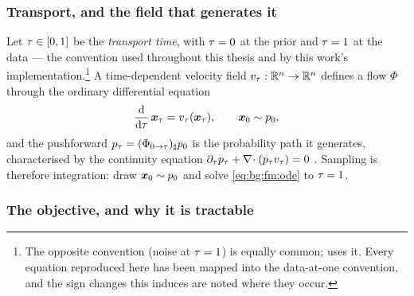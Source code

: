 \subsubsection*{Transport, and the field that generates it}

Let $\tau \in [0,1]$ be the \emph{transport time}, with $\tau = 0$ at the prior and
$\tau = 1$ at the data --- the convention used throughout this thesis and by this work's
implementation.\footnote{The opposite convention (noise at $\tau=1$) is equally common;
\parencite{geng2025meanflow} uses it. Every equation reproduced here has been mapped into the
data-at-one convention, and the sign changes this induces are noted where they occur.}
A time-dependent velocity field $v_{\tau}:\mathbb{R}^{n}\to\mathbb{R}^{n}$ defines a flow
$\Phi$ through the ordinary differential equation
\begin{equation}\label{eq:bg:fm:ode}
  \frac{\mathrm{d}}{\mathrm{d}\tau}\,\boldsymbol{x}_{\tau} = v_{\tau}(\boldsymbol{x}_{\tau}),
  \qquad \boldsymbol{x}_{0} \sim p_{0},
\end{equation}
and the pushforward $p_{\tau} = (\Phi_{0\to\tau})_{\sharp}p_{0}$ is the probability path
it generates, characterised by the continuity equation
$\partial_{\tau}p_{\tau} + \nabla\!\cdot(p_{\tau}v_{\tau}) = 0$
\parencite[Sec.~2]{lipman2023flow}. Sampling is therefore integration: draw $\boldsymbol{x}_{0}\sim p_{0}$ and
solve \eqref{eq:bg:fm:ode} to $\tau = 1$.

\subsubsection*{The objective, and why it is tractable}

